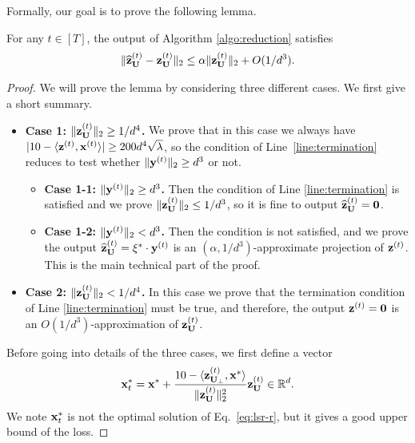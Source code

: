 Formally, our goal is to prove the following lemma.
\begin{lemma}
\label{lem:reduction-lsr}
For any $t \in [T]$, the output of Algorithm \ref{algo:reduction} satisfies
\begin{align*}
\|\widehat{\mathbf{z}}_{\mathbf{U}}^{{(t)}} - \mathbf{z}_{\mathbf{U}}^{(t)}\|_2 \leq \alpha \|\mathbf{z}_{\mathbf{U}}^{(t)}\|_2 + O(1/d^3).
\end{align*}
\end{lemma}
\begin{proof}
We will prove the lemma by considering three different cases. We first give a short summary.
\begin{itemize}
\item {\bf Case 1: $\|\mathbf{z}_{\mathbf{U}}^{(t)}\|_2 \geq 1/d^4$.} We prove that in this case we always have $|10 - \langle \mathbf{z}^{(t)}, \mathbf{x}^{(t)}\rangle| \geq 200 d^4\sqrt{\lambda}$, so the condition of Line~\ref{line:termination} reduces to test whether $\|\mathbf{y}^{(t)}\|_2 \geq d^3$ or not.
\begin{itemize}
\item {\bf Case 1-1: $\|\mathbf{y}^{(t)}\|_2 \geq d^3$.} Then the condition of Line \ref{line:termination} is satisfied and we prove $\|\mathbf{z}_{\mathbf{U}}^{(t)}\|_2 \leq 1/d^3$, so it is fine to output $\widehat{\mathbf{z}}_{\mathbf{U}}^{(t)} = \bf{0}$.
\item {\bf Case 1-2: $\|\mathbf{y}^{(t)}\|_2 < d^3$.} Then the condition is not satisfied, and we prove the output $\widehat{\mathbf{z}}_{\mathbf{U}}^{(t)} = \xi^{*} \cdot \mathbf{y}^{(t)}$ is an $(\alpha, 1/d^3)$-approximate projection of $\mathbf{z}^{(t)}$. 
This is the main technical part of the proof.
\end{itemize}
\item {\bf Case 2: $\|\mathbf{z}_{\mathbf{U}}^{(t)}\|_2 < 1/d^4$.} In this case we prove that the termination condition of Line \ref{line:termination} must be true, and therefore, the output $\mathbf{z}^{{(t)}} = \mathbf{0}$ is an $O(1/d^3)$-approximation of $\mathbf{z}_{\mathbf{U}}^{{(t)}}$.
\end{itemize}
Before going into details of the three cases, we first define a vector
\begin{align}\label{eq:x_rt*}
\mathbf{x}^{*}_{t} = \mathbf{x}^{*} + \frac{10 - \langle \mathbf{z}_{\mathbf{U}_\perp}^{(t)},\mathbf{x}^{*}\rangle}{\|\mathbf{z}_{\mathbf{U}}^{(t)}\|_2^2} \mathbf{z}_{\mathbf{U}}^{(t)} \in \mathbb{R}^d.
\end{align}
We note $\mathbf{x}^{*}_{t}$ is not the optimal solution of Eq.~\eqref{eq:lsr-r}, but it gives a good upper bound of the loss. 


\end{proof}
